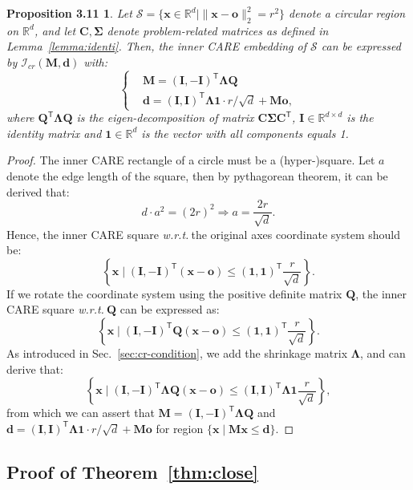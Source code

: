 \documentclass{article}
\theoremstyle{plain}
\newtheorem*{proposition310}{Proposition 3.11}
\theoremstyle{definition}
\def \x {\mathbf{x}}
\def \I {\mathbf{I}}
\def \M {\mathbf{M}}
\def \o {\mathbf{o}}
\def \wrt {\textit{w.r.t.}$\ $}
\def \Sec {Sec.}
\def \x {\mathbf{x}}
\def \sI {\mathcal{I}}
\def \sS {\mathcal{S}}
\def \Q {\mathbf{Q}}
\def \I {\mathbf{I}}
\def \M {\mathbf{M}}
\def \C {\mathbf{C}}
\def \d {\mathbf{d}}
\begin{document}
\begin{proposition310}
  Let $\sS=\{\x\in\mathbb{R}^d\mid \|\x-\bm{o}\|_2^2 = r^2\}$ denote a circular region on $\mathbb{R}^d$, and let $\C,\bm{\Sigma}$ denote problem-related matrices as defined in Lemma~\ref{lemma:identi}. 
  Then, the inner CARE embedding of $\sS$ can be expressed by $\sI_{cr}\left(\M, \d\right)$ with:
  \vspace*{-0.03in}
  \begin{equation*}
    \left\{
      \begin{aligned}
        &\M = (\I,-\I)^\mathsf{T}\bm{\Lambda}\Q\\
        &\d = (\I,\I)^\mathsf{T}\bm{\Lambda}\bm{1}\cdot r/\sqrt{d}+\M\o,
      \end{aligned}
    \right.
  \end{equation*}
  \vskip -0.12in
  where $\Q^\mathsf{T}\bm{\Lambda}\Q$ is the eigen-decomposition of matrix $\C\bm{\Sigma}\C^\mathsf{T}$, $\I\in\mathbb{R}^{d\times d}$ is the identity matrix and $\bm{1}\in\mathbb{R}^{d}$ is the vector with all components equals 1.
  \end{proposition310}

\begin{proof}
  \label{proof:inner4circle}
  The inner CARE rectangle of a circle must be a (hyper-)square. Let $a$ denote the edge length of the square, then by pythagorean theorem, it can be derived  that:
  \[
  d\cdot a^2 = (2r)^2\Rightarrow a = \frac{2r}{\sqrt{d}}.
  \]
  Hence, the inner CARE square \wrt the original axes coordinate system should be:
  \[
    \left\{\x\mid(\I,-\I)^\mathsf{T}(\x-\o)\leq (\bm{1}, \bm{1})^\mathsf{T} \frac{r}{\sqrt{d}}\right\}.
  \]
  If we rotate the coordinate system using the positive definite matrix $\Q$, the inner CARE square \wrt $\Q$ can be expressed as:
  \[
    \left\{\x\mid(\I,-\I)^\mathsf{T}\Q(\x-\o)\leq (\bm{1}, \bm{1})^\mathsf{T} \frac{r}{\sqrt{d}}\right\}.
  \]
As introduced in \Sec~\ref{sec:cr-condition}, we add the shrinkage matrix $\bm{\Lambda}$, and can derive that:
\[
    \left\{\x\mid(\I,-\I)^\mathsf{T}\bm{\Lambda}\Q(\x-\o)\leq (\I, \I)^\mathsf{T} \bm{\Lambda}\bm{1}\frac{r}{\sqrt{d}}\right\},
\]
from which we can assert that $\M = (\I,-\I)^\mathsf{T}\bm{\Lambda}\Q$ and $\d = (\I,\I)^\mathsf{T}\bm{\Lambda}\bm{1}\cdot r/\sqrt{d}+\M\o$ for region $\{\x\mid \M\x\leq \d\}$.
\end{proof}


\subsection{Proof of Theorem~\ref{thm:close}}
\end{document}
